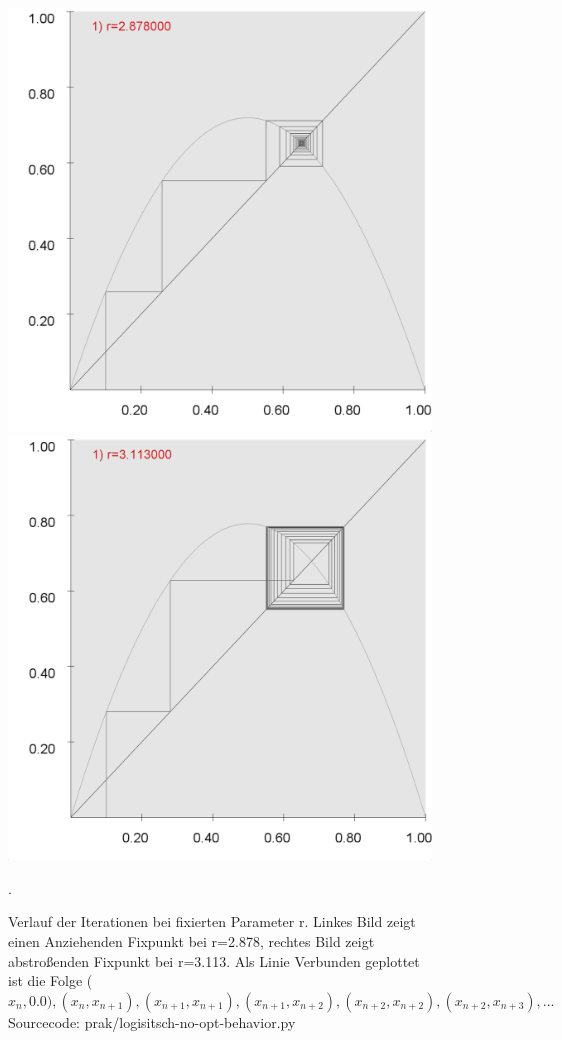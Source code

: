 \documentclass{scrartcl}
\begin{document}
\begin{figure}
\includegraphics[scale=0.2]{fixpunkt-2878}
\includegraphics[scale=0.2]{fixpunkt-311}
\caption{Verlauf der Iterationen bei fixierten Parameter r. Linkes Bild zeigt einen Anziehenden Fixpunkt bei r=2.878, rechtes Bild zeigt abstroßenden Fixpunkt bei r=3.113. Als Linie Verbunden geplottet ist die Folge ($x_n, 0.0), (x_n, x_{n+1}), (x_{n+1}, x_{n+1}), (x_{n+1}, x_{n+2}), (x_{n+2}, x_{n+2}), (x_{n+2}, x_{n+3}), ...$ Sourcecode: prak/logisitsch-no-opt-behavior.py}. 
\end{figure}
\end{document}
